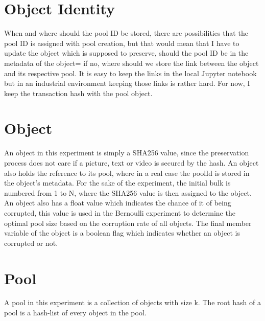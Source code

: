 \section{Object Identity}
When and where should the pool ID be stored, there are possibilities that the pool ID is assigned with pool creation, but that would mean that I have to update the object which is supposed to preserve, should the pool ID be in the metadata of the object= if no, where should we store the link between the object and its respective pool. It is easy to keep the links in the local Jupyter notebook but in an industrial environment keeping those links is rather hard. For now, I keep the transaction hash with the pool object.
\section{Object}
An object in this experiment is simply a SHA256 value, since the preservation process does not care if a picture, text or video is secured by the hash. An object also holds the reference to its pool, where in a real case the poolId is stored in the object's metadata. For the sake of the experiment, the initial bulk is numbered from 1 to N, where the SHA256 value is then assigned to the object. An object also has a float value which indicates the chance of it of being corrupted, this value is used in the Bernoulli experiment to determine the optimal pool size based on the corruption rate of all objects. The final member variable of the object is a boolean flag which indicates whether an object is corrupted or not.

\section{Pool}
A pool in this experiment is a collection of objects with size k. The root hash of a pool is a hash-list of every object in the pool.

